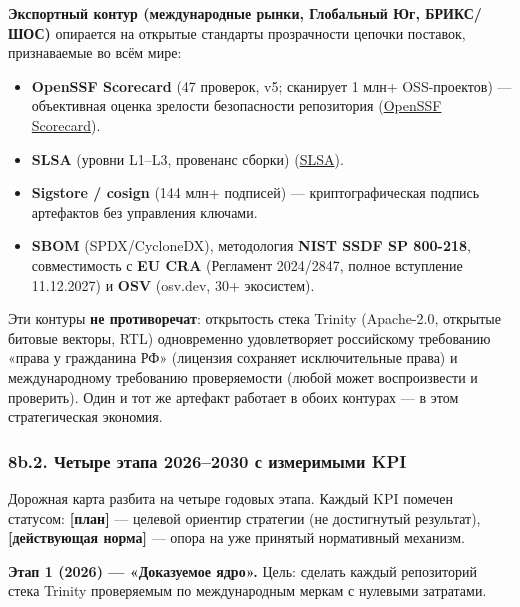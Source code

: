 \documentclass[
  russian,
]{article}
\providecommand{\tightlist}{%
  \setlength{\itemsep}{0pt}\setlength{\parskip}{0pt}}
\begin{document}
\textbf{Экспортный контур (международные рынки, Глобальный Юг,
БРИКС/ШОС)} опирается на открытые стандарты прозрачности цепочки
поставок, признаваемые во всём мире:

\begin{itemize}
\tightlist
\item
  \textbf{OpenSSF Scorecard} (47 проверок, v5; сканирует 1 млн+
  OSS-проектов) --- объективная оценка зрелости безопасности репозитория
  (\href{https://openssf.org/projects/scorecard/}{OpenSSF Scorecard}).
\item
  \textbf{SLSA} (уровни L1--L3, провенанс сборки)
  (\href{https://slsa.dev}{SLSA}).
\item
  \textbf{Sigstore / cosign} (144 млн+ подписей) --- криптографическая
  подпись артефактов без управления ключами.
\item
  \textbf{SBOM} (SPDX/CycloneDX), методология \textbf{NIST SSDF SP
  800-218}, совместимость с \textbf{EU CRA} (Регламент 2024/2847, полное
  вступление 11.12.2027) и \textbf{OSV} (osv.dev, 30+ экосистем).
\end{itemize}

Эти контуры \textbf{не противоречат}: открытость стека Trinity
(Apache-2.0, открытые битовые векторы, RTL) одновременно удовлетворяет
российскому требованию «права у гражданина РФ» (лицензия сохраняет
исключительные права) и международному требованию проверяемости (любой
может воспроизвести и проверить). Один и тот же артефакт работает в
обоих контурах --- в этом стратегическая экономия.

\subsubsection{8b.2. Четыре этапа 2026--2030 с измеримыми
KPI}\label{b.2.-ux447ux435ux442ux44bux440ux435-ux44dux442ux430ux43fux430-20262030-ux441-ux438ux437ux43cux435ux440ux438ux43cux44bux43cux438-kpi}

Дорожная карта разбита на четыре годовых этапа. Каждый KPI помечен
статусом: \textbf{{[}план{]}} --- целевой ориентир стратегии (не
достигнутый результат), \textbf{{[}действующая норма{]}} --- опора на
уже принятый нормативный механизм.

\textbf{Этап 1 (2026) --- «Доказуемое ядро».} Цель: сделать каждый
репозиторий стека Trinity проверяемым по международным меркам с нулевыми
затратами.
\end{document}
